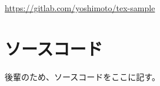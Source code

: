 \documentclass[a4j,openany,12pt]{jsbook}
\begin{document}
\listoftables %

\listoffigures %

\begin{thebibliography}{99}
    \url{https://gitlab.com/yoshimoto/tex-sample}
\end{thebibliography}

\appendix
\chapter{ソースコード}
後輩のため、ソースコードをここに記す。

\end{document}
